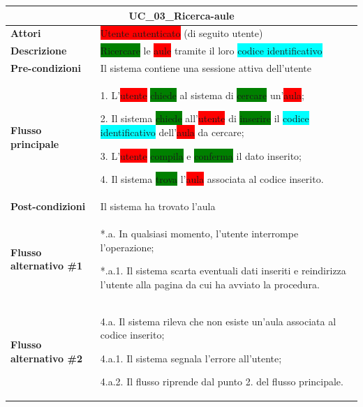 \documentclass[11pt]{article}
\begin{document}
\begin{table}[H]
\centering
\begin{tabularx}{1\textwidth}{|l|X|}
\hline
\multicolumn{2}{|c|}{\textbf{UC\_03\_Ricerca-aule}}\\
\hline \textbf{Attori} & \colorbox{red}{Utente autenticato} (di seguito utente)\\
\hline \textbf{Descrizione} & \colorbox{green}{Ricercare} le \colorbox{red}{aule} tramite il loro \colorbox{cyan}{codice identificativo}\\
\hline \textbf{Pre-condizioni} & Il sistema contiene una sessione attiva dell'utente\\
\hline \textbf{Flusso principale} & 
1. L'\colorbox{red}{utente} \colorbox{green}{chiede} al sistema di \colorbox{green}{cercare} un'\colorbox{red}{aula};

2. Il sistema \colorbox{green}{chiede} all'\colorbox{red}{utente} di \colorbox{green}{inserire} il \colorbox{cyan}{codice identificativo} dell'\colorbox{red}{aula} da cercare;

3. L'\colorbox{red}{utente} \colorbox{green}{compila} e \colorbox{green}{conferma} il dato inserito;

4. Il sistema \colorbox{green}{trova} l'\colorbox{red}{aula} associata al codice inserito.
\\
\hline \textbf{Post-condizioni} & Il sistema ha trovato l'aula\\
\hline \textbf{Flusso alternativo \#1} & 
*.a. In qualsiasi momento, l'utente interrompe l'operazione;

*.a.1. Il sistema scarta eventuali dati inseriti e reindirizza l'utente alla pagina
da cui ha avviato la procedura.
\\
\hline \textbf{Flusso alternativo \#2} & 
4.a. Il sistema rileva che non esiste un'aula associata al codice inserito;

4.a.1. Il sistema segnala l'errore all'utente;

4.a.2. Il flusso riprende dal punto 2. del flusso principale.
\\
\hline
\end{tabularx}
\end{table}
\end{document}
